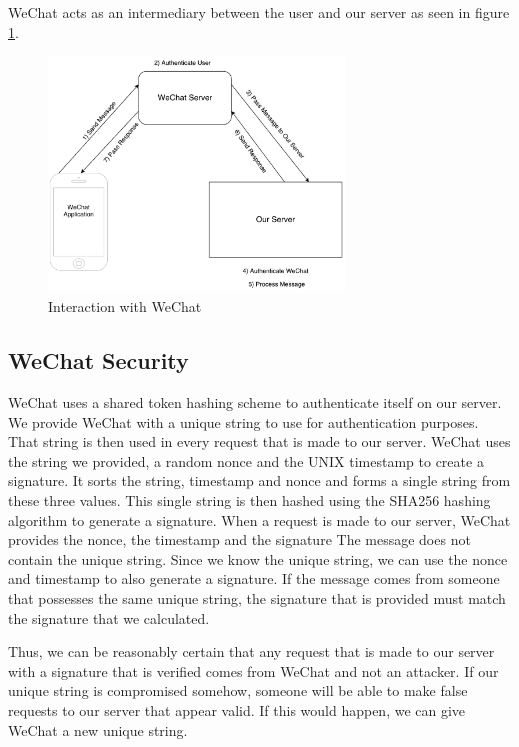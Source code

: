 WeChat acts as an intermediary between the user and our server as seen in figure \ref{fig:wechat_interaction}. 

\begin{figure}
  \centering
    \includegraphics[width=0.7\textwidth]{figs/Wechat_interaction.pdf}
   \caption{Interaction with WeChat} 
   \label{fig:wechat_interaction}
\end{figure}

\subsection{WeChat Security}
\label{sct:wechat_security}

WeChat uses a shared token hashing scheme to authenticate itself on our server. We provide WeChat with a unique string to use for authentication purposes. That string is then used in every request that is made to our server. WeChat uses the string we provided, a random nonce and the UNIX timestamp to create a signature. It sorts the string, timestamp and nonce and forms a single string from these three values. This single string is then hashed using the SHA256 hashing algorithm to generate a signature. When a request is made to our server, WeChat provides the nonce, the timestamp and the signature The message does not contain the unique string. Since we know the unique string, we can use the nonce and timestamp to also generate a signature. If the message comes from someone that possesses the same unique string, the signature that is provided must match the signature that we calculated.

Thus, we can be reasonably certain that any request that is made to our server with a signature that is verified comes from WeChat and not an attacker. If our unique string is compromised somehow, someone will be able to make false requests to our server that appear valid. If this would happen, we can give WeChat a new unique string. 

